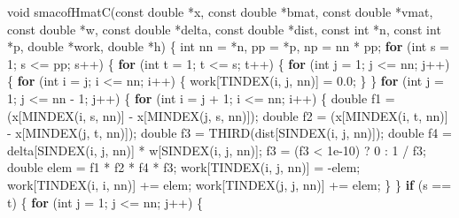 \documentclass[12pt,]{article}
\newenvironment{Shaded}{\begin{snugshade}}{\end{snugshade}}
\newcommand{\DataTypeTok}[1]{\textcolor[rgb]{0.13,0.29,0.53}{#1}}
\newcommand{\DecValTok}[1]{\textcolor[rgb]{0.00,0.00,0.81}{#1}}
\newcommand{\FloatTok}[1]{\textcolor[rgb]{0.00,0.00,0.81}{#1}}
\newcommand{\ControlFlowTok}[1]{\textcolor[rgb]{0.13,0.29,0.53}{\textbf{#1}}}
\newcommand{\NormalTok}[1]{#1}
\begin{document}
\begin{Shaded}
\begin{Highlighting}[]
\DataTypeTok{void}\NormalTok{ smacofHmatC(}\DataTypeTok{const} \DataTypeTok{double}\NormalTok{ *x, }\DataTypeTok{const} \DataTypeTok{double}\NormalTok{ *bmat, }\DataTypeTok{const} \DataTypeTok{double}\NormalTok{ *vmat,}
                 \DataTypeTok{const} \DataTypeTok{double}\NormalTok{ *w, }\DataTypeTok{const} \DataTypeTok{double}\NormalTok{ *delta, }\DataTypeTok{const} \DataTypeTok{double}\NormalTok{ *dist,}
                 \DataTypeTok{const} \DataTypeTok{int}\NormalTok{ *n, }\DataTypeTok{const} \DataTypeTok{int}\NormalTok{ *p, }\DataTypeTok{double}\NormalTok{ *work, }\DataTypeTok{double}\NormalTok{ *h) \{}
    \DataTypeTok{int}\NormalTok{ nn = *n, pp = *p, np = nn * pp;}
    \ControlFlowTok{for}\NormalTok{ (}\DataTypeTok{int}\NormalTok{ s = }\DecValTok{1}\NormalTok{; s <= pp; s++) \{}
        \ControlFlowTok{for}\NormalTok{ (}\DataTypeTok{int}\NormalTok{ t = }\DecValTok{1}\NormalTok{; t <= s; t++) \{}
            \ControlFlowTok{for}\NormalTok{ (}\DataTypeTok{int}\NormalTok{ j = }\DecValTok{1}\NormalTok{; j <= nn; j++) \{}
                \ControlFlowTok{for}\NormalTok{ (}\DataTypeTok{int}\NormalTok{ i = j; i <= nn; i++) \{}
\NormalTok{                    work[TINDEX(i, j, nn)] = }\FloatTok{0.0}\NormalTok{;}
\NormalTok{                \}}
\NormalTok{            \}}
            \ControlFlowTok{for}\NormalTok{ (}\DataTypeTok{int}\NormalTok{ j = }\DecValTok{1}\NormalTok{; j <= nn - }\DecValTok{1}\NormalTok{; j++) \{}
                \ControlFlowTok{for}\NormalTok{ (}\DataTypeTok{int}\NormalTok{ i = j + }\DecValTok{1}\NormalTok{; i <= nn; i++) \{}
                    \DataTypeTok{double}\NormalTok{ f1 = (x[MINDEX(i, s, nn)] - x[MINDEX(j, s, nn)]);}
                    \DataTypeTok{double}\NormalTok{ f2 = (x[MINDEX(i, t, nn)] - x[MINDEX(j, t, nn)]);}
                    \DataTypeTok{double}\NormalTok{ f3 = THIRD(dist[SINDEX(i, j, nn)]);}
                    \DataTypeTok{double}\NormalTok{ f4 = delta[SINDEX(i, j, nn)] * w[SINDEX(i, j, nn)];}
\NormalTok{                    f3 = (f3 < }\FloatTok{1e-10}\NormalTok{) ? }\DecValTok{0}\NormalTok{ : }\DecValTok{1}\NormalTok{ / f3;}
                    \DataTypeTok{double}\NormalTok{ elem = f1 * f2 * f4 * f3;}
\NormalTok{                    work[TINDEX(i, j, nn)] = -elem;}
\NormalTok{                    work[TINDEX(i, i, nn)] += elem;}
\NormalTok{                    work[TINDEX(j, j, nn)] += elem;}
\NormalTok{                \}}
\NormalTok{            \}}
            \ControlFlowTok{if}\NormalTok{ (s == t) \{}
                \ControlFlowTok{for}\NormalTok{ (}\DataTypeTok{int}\NormalTok{ j = }\DecValTok{1}\NormalTok{; j <= nn; j++) \{}

\end{Highlighting}
\end{Shaded}
\end{document}
